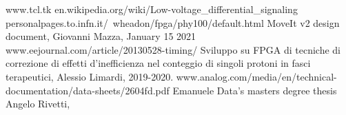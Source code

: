 \begin{thebibliography}{00}
	www.tcl.tk
	en.wikipedia.org/wiki/Low-voltage\_differential\_signaling
	personalpages.to.infn.it/~wheadon/fpga/phy100/default.html
	MoveIt v2 design document, Giovanni Mazza, January 15 2021
	www.eejournal.com/article/20130528-timing/
	Sviluppo su FPGA di tecniche di correzione di effetti d'inefficienza nel conteggio di singoli protoni in fasci terapeutici, Alessio Limardi, 2019-2020.
	www.analog.com/media/en/technical-documentation/data-sheets/2604fd.pdf
	Emanuele Data's masters degree thesis
	 Angelo Rivetti,
	
	
\end{thebibliography}
